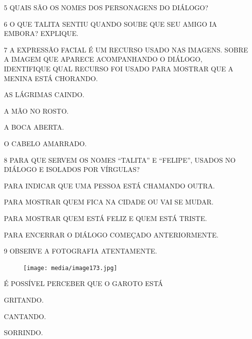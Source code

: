 \num{5} QUAIS SÃO OS NOMES DOS PERSONAGENS DO DIÁLOGO?


\num{6} O QUE TALITA SENTIU QUANDO SOUBE QUE SEU AMIGO IA EMBORA? EXPLIQUE.


\num{7} A EXPRESSÃO FACIAL É UM RECURSO USADO NAS 
IMAGENS. SOBRE A IMAGEM QUE APARECE ACOMPANHANDO 
O DIÁLOGO, IDENTIFIQUE QUAL RECURSO FOI USADO PARA MOSTRAR QUE A MENINA ESTÁ CHORANDO.

\begin{boxlist}%
 AS LÁGRIMAS CAINDO.

 A MÃO NO ROSTO.

 A BOCA ABERTA.

 O CABELO AMARRADO.
\end{boxlist}

\num{8} PARA QUE SERVEM OS NOMES ``TALITA'' E ``FELIPE'', USADOS NO DIÁLOGO E ISOLADOS POR VÍRGULAS?

\begin{boxlist}%
 PARA INDICAR QUE UMA PESSOA ESTÁ CHAMANDO OUTRA.

 PARA MOSTRAR QUEM FICA NA CIDADE OU VAI SE MUDAR.

 PARA MOSTRAR QUEM ESTÁ FELIZ E QUEM ESTÁ TRISTE.

 PARA ENCERRAR O DIÁLOGO COMEÇADO ANTERIORMENTE.
\end{boxlist}


\num{9} OBSERVE A FOTOGRAFIA ATENTAMENTE.

\begin{figure}[H]
\centering
\texttt{[image: media/image173.jpg]}
\end{figure}

É POSSÍVEL PERCEBER QUE O GAROTO ESTÁ

\begin{multicols}{3}
\begin{boxlist}
 GRITANDO. 

 CANTANDO.

 SORRINDO.
\end{boxlist}
\end{multicols}

